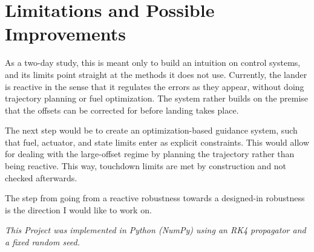 \documentclass[11pt]{article}
\begin{document}
\section*{Limitations and Possible Improvements}
As a two-day study, this is meant only to build an intuition on control systems, and its limits point straight at the methods it does not use. Currently, the lander is reactive in the sense that it regulates the errors as they appear, without doing trajectory planning or fuel optimization. The system rather builds on the premise that the offsets can be corrected for before landing takes place.

The next step would be to create an optimization-based guidance system, such that fuel, actuator, and state limits enter as explicit constraints. This would allow for dealing with the large-offset regime by planning the trajectory rather than being reactive. This way, touchdown limits are met by construction and not checked afterwards. 

The step from going from a reactive robustness towards a designed-in robustness is the direction I would like to work on.



\vspace{2pt}
{\footnotesize\itshape This Project was implemented in Python (NumPy) using an RK4 propagator and a fixed random seed.}
\end{document}
